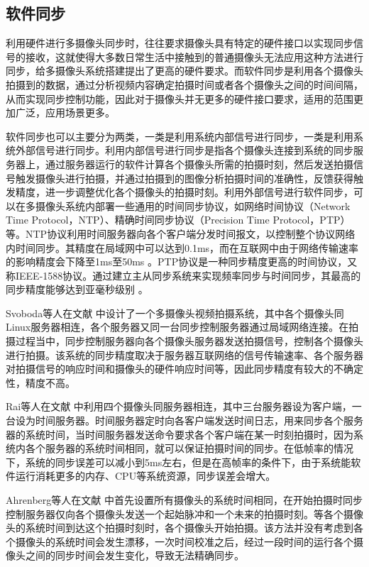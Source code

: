 \subsection{软件同步}

利用硬件进行多摄像头同步时，往往要求摄像头具有特定的硬件接口以实现同步信号的接收，这就使得大多数日常生活中接触到的普通摄像头无法应用这种方法进行同步，给多摄像头系统搭建提出了更高的硬件要求。而软件同步是利用各个摄像头拍摄到的数据，通过分析视频内容确定拍摄时间或者各个摄像头之间的时间间隔，从而实现同步控制功能，因此对于摄像头并无更多的硬件接口要求，适用的范围更加广泛，应用场景更多。

软件同步也可以主要分为两类，一类是利用系统内部信号进行同步，一类是利用系统外部信号进行同步。利用内部信号进行同步是指各个摄像头连接到系统的同步服务器上，通过服务器运行的软件计算各个摄像头所需的拍摄时刻，然后发送拍摄信号触发摄像头进行拍摄，并通过拍摄到的图像分析拍摄时间的准确性，反馈获得触发精度，进一步调整优化各个摄像头的拍摄时刻。利用外部信号进行软件同步，可以在多摄像头系统内部署一些通用的时间同步协议，如网络时间协议（Network Time Protocol，NTP）、精确时间同步协议（Precision Time Protocol，PTP）等。NTP协议利用时间服务器向各个客户端分发时间报文，以控制整个协议网络内时间同步。其精度在局域网中可以达到0.1ms，而在互联网中由于网络传输速率的影响精度会下降至1ms至50ms \cite{mills2010network} 。PTP协议是一种同步精度更高的时间协议，又称IEEE-1588协议。通过建立主从同步系统来实现频率同步与时间同步，其最高的同步精度能够达到亚毫秒级别 \cite{correll2005design} 。

Svoboda等人在文献 \cite{svoboda2002viroom} 中设计了一个多摄像头视频拍摄系统，其中各个摄像头同Linux服务器相连，各个服务器又同一台同步控制服务器通过局域网络连接。在拍摄过程当中，同步控制服务器向各个摄像头服务器发送拍摄信号，控制各个摄像头进行拍摄。该系统的同步精度取决于服务器互联网络的信号传输速率、各个服务器对拍摄信号的响应时间和摄像头的硬件响应时间等，因此同步精度有较大的不确定性，精度不高。

Rai等人在文献 \cite{rai2003cost} 中利用四个摄像头同服务器相连，其中三台服务器设为客户端，一台设为时间服务器。时间服务器定时向各客户端发送时间日志，用来同步各个服务器的系统时间，当时间服务器发送命令要求各个客户端在某一时刻拍摄时，因为系统内各个服务器的系统时间相同，就可以保证拍摄时间的同步。在低帧率的情况下，系统的同步误差可以减小到5ms左右，但是在高帧率的条件下，由于系统能软件运行消耗更多的内存、CPU等系统资源，同步误差会增大。

Ahrenberg等人在文献 \cite{ahrenberg2004mobile} 中首先设置所有摄像头的系统时间相同，在开始拍摄时同步控制服务器仅向各个摄像头发送一个起始脉冲和一个未来的拍摄时刻。等各个摄像头的系统时间到达这个拍摄时刻时，各个摄像头开始拍摄。该方法并没有考虑到各个摄像头的系统时间会发生漂移，一次时间校准之后，经过一段时间的运行各个摄像头之间的同步时间会发生变化，导致无法精确同步。

